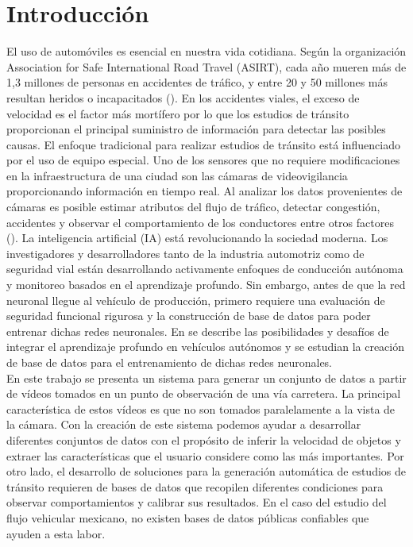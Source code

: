 \documentclass{llncs}
\begin{document}
\section{Introducción}
El uso de automóviles es esencial en nuestra vida cotidiana. Según la organización Association for Safe International Road Travel (ASIRT), cada año mueren más de 1,3 millones de personas en accidentes de tráfico, y entre 20 y 50 millones más resultan heridos o incapacitados (\cite{1}).
En los accidentes viales, el exceso de velocidad es el factor más mortífero por lo que los estudios de tránsito proporcionan el principal suministro de información para detectar las posibles causas. El enfoque tradicional para realizar estudios de tránsito está influenciado por el uso de equipo especial.
Uno de los sensores que no requiere modificaciones en la infraestructura de una ciudad son las cámaras de videovigilancia proporcionando información en tiempo real. Al analizar los datos provenientes de cámaras es posible estimar atributos del flujo de tráfico, detectar congestión, accidentes y observar el comportamiento de los conductores  entre otros factores (\cite{Yang2019Vehicle}). 
La inteligencia artificial (IA) está revolucionando la sociedad moderna. Los investigadores y desarrolladores tanto de la industria automotriz como de seguridad vial están desarrollando activamente enfoques de conducción autónoma y monitoreo basados en el aprendizaje profundo. Sin embargo, antes de que la red neuronal llegue al vehículo de producción, primero requiere una evaluación de seguridad funcional rigurosa y la construcción de base de datos para poder entrenar dichas redes neuronales. En \cite{jjj} se describe las posibilidades y desafíos de integrar el aprendizaje profundo en vehículos autónomos y se estudian la creación de base de datos para el entrenamiento de dichas redes neuronales. \\
En este trabajo se presenta un sistema para generar un conjunto de datos a partir de vídeos tomados en un punto de observación de una vía carretera. La principal característica de estos vídeos es que no son tomados paralelamente a la vista de la cámara. Con la creación de este sistema podemos ayudar a desarrollar diferentes conjuntos de datos con el propósito de inferir la velocidad de objetos y extraer las características que el usuario considere como las más importantes. Por otro lado, el desarrollo de soluciones para la generación automática de estudios de tránsito requieren de bases de datos que recopilen diferentes condiciones para observar comportamientos y calibrar sus resultados. En el caso del estudio del flujo vehicular mexicano, no existen bases de datos públicas confiables que ayuden a esta labor. 
\end{document}
